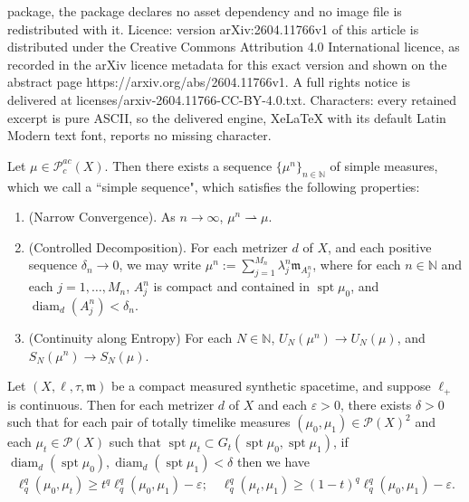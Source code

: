 \documentclass[10pt,a4paper]{amsart}
\DeclareMathOperator{\diam}{diam}
\DeclareMathOperator{\spt}{spt}
\newcommand{\N}{\mathbb{N}}
\newcommand{\Pcal}{\mathcal{P}}
\newcommand{\m}{\mathfrak{m}}
\newcommand{\narrowto}{\rightharpoonup}
\renewcommand{\epsilon}{\varepsilon}
\begin{document}
package, the package declares no asset dependency and no image file is redistributed with it. Licence: version arXiv:2604.11766v1 of this article is distributed under the Creative Commons Attribution 4.0 International licence, as recorded in the arXiv licence metadata for this exact version and shown on the abstract page https://arxiv.org/abs/2604.11766v1. A full rights notice is delivered at licenses/arxiv-2604.11766-CC-BY-4.0.txt. Characters: every retained excerpt is pure ASCII, so the delivered engine, XeLaTeX with its default Latin Modern text font, reports no missing character.
\begin{prop}\label{simplesequence} Let $\mu\in \Pcal_c^{ac}(X)$. Then there exists a sequence $\{\mu^n\}_{n\in\N}$ of simple measures, which we call a ``simple sequence", which satisfies the following properties: 
\begin{enumerate}
\item (Narrow Convergence). As $n\to\infty$, $\mu^n\narrowto\mu$. 
\item (Controlled Decomposition). For each metrizer $d$ of $X$, and each positive sequence $\delta_n\to 0$, we may write $\mu^n:= \sum_{j=1}^{M_n}\lambda_j^n \m_{A_j^n}$, where for each $n\in\N$ and each $j=1,\dots, M_n$, $A_j^n$ is compact and contained in $\spt\mu_0$, and $\diam_d(A_j^n)<\delta_n$. 

\item (Continuity along Entropy) For each $N\in\N$, $U_N(\mu^n)\to U_N(\mu)$, and $S_N(\mu^n)\to S_N(\mu)$. 

\end{enumerate}
\end{prop}

\begin{lemma}\label{midpointapproxlemma} Let $(X,\ell, \tau,\m)$ be a compact measured synthetic spacetime, and suppose $\ell_+$ is continuous. Then for each metrizer $d$ of $X$ and each $\epsilon>0$, there exists $\delta>0$ such that for each pair of totally timelike measures $(\mu_0,\mu_1)\in\Pcal(X)^2$ and each $\mu_t\in \Pcal(X)$ such that $\spt\mu_t\subset G_t(\spt\mu_0,\spt\mu_1)$, if $\diam_d(\spt\mu_0),\diam_d(\spt\mu_1)<\delta$ then we have 
\begin{align}
\ell_q^q(\mu_0, \mu_t)\geq t^q\ell^q_q(\mu_0,\mu_1)-\epsilon;\quad 
\ell_q^q(\mu_t, \mu_1)\geq (1-t)^q\ell^q_q(\mu_0,\mu_1)-\epsilon.
\end{align}
\end{lemma}
\end{document}
